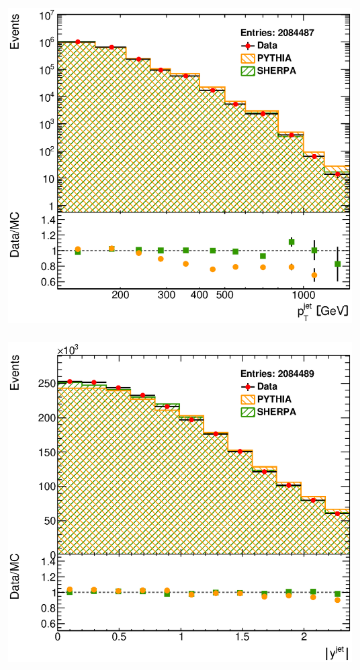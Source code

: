 \documentclass[12pt, twoside]{article}
\numberwithin{equation}{section}
\numberwithin{figure}{section}
\newenvironment{changemargin}[2]{%
\begin{list}{}{%
\setlength{\topsep}{0pt}%
\setlength{\leftmargin}{#1}%
\setlength{\rightmargin}{#2}%
\setlength{\listparindent}{\parindent}%
\setlength{\itemindent}{\parindent}%
\setlength{\parsep}{\parskip}%
}%
\item[]}{\end{list}}
\begin{document}
\begin{figure}
\begin{changemargin}{-1.0cm}{-0.75cm}
\begin{changemargin}{-0.75cm}{-1.0cm}
        \vspace{0.2cm}
        \begin{subfigure}[b]{0.37\textwidth}
            \includegraphics[width=\textwidth]{./images/Results(MUReweight)/DEF-104.eps}
            \subcaption{}
            \label{fig:MUReweightPtJet}
        \end{subfigure}
        \begin{subfigure}[b]{0.37\textwidth}
            \includegraphics[width=\textwidth]{./images/Results(MUReweight)/DEF-105.eps}

\end{subfigure}
\end{changemargin}
\end{changemargin}
\end{figure}
\end{document}
